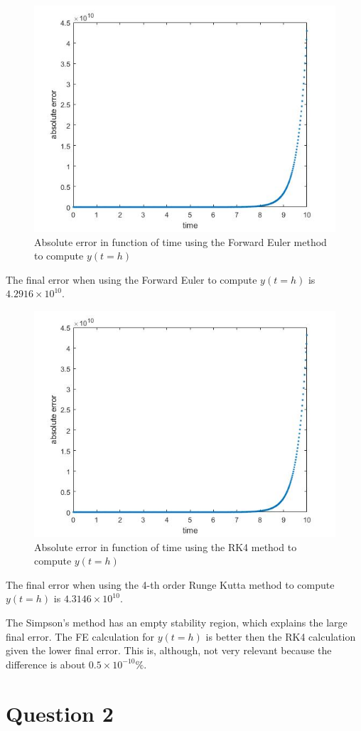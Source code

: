\documentclass[a4paper, 11pt]{article}
\begin{document}
		\begin{figure}[H]
			\centering
			\includegraphics[width=.6\linewidth]{ex1_fe.jpg}
			\caption{Absolute error in function of time using the Forward Euler method to compute $y(t=h)$}
			\label{fig:ex1_fe}
		\end{figure}
		
		The final error when using the Forward Euler to compute $y(t=h)$ is $4.2916 \times 10^{10}$.
		
		\begin{figure}[H]
			\centering
			\includegraphics[width=.6\linewidth]{ex1_rk4.jpg}
			\caption{Absolute error in function of time using the RK4 method to compute $y(t=h)$}
			\label{fig:ex1_rk4}
		\end{figure}
		
		The final error when using the 4-th order Runge Kutta method to compute $y(t=h)$  is $4.3146 \times 10^{10}$.
		
		The Simpson's method has an empty stability region, which explains the large final error.
		The FE calculation for $y(t=h)$ is better then the RK4 calculation given the lower final error.
		This is, although, not very relevant because the difference is about $ 0.5 \times 10^{-10} \% $.
		
		\section*{Question 2}
		
\end{document}
